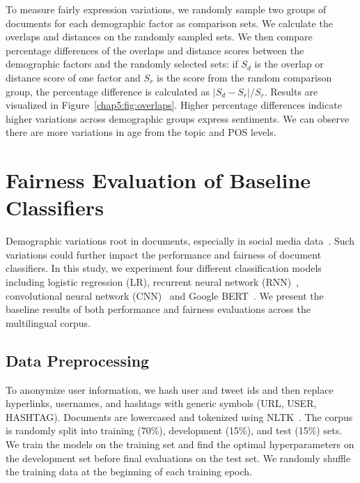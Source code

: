 To measure fairly expression variations, we randomly sample two groups of documents for each demographic factor as comparison sets. 
We calculate the overlaps and distances on the randomly sampled sets. 
We then compare percentage differences of the overlaps and distance scores between the demographic factors and the randomly selected sets: if $S_d$ is the overlap or distance score of one factor and $S_r$ is the score from the random comparison group, the percentage difference is calculated as $|S_d - S_r|/S_r$.
Results are visualized in Figure~\ref{chap5:fig:overlaps}. 
Higher percentage differences indicate higher variations across demographic groups express sentiments.
We can observe there are more variations in age from the topic and POS levels.


\section{Fairness Evaluation of Baseline Classifiers}
\label{chap5:sec:fair_eval}

Demographic variations root in documents, especially in social media data~\cite{volkova2013exploring,hovy2015demographic,johannsen2015cross}.
Such variations could further impact the performance and fairness of document classifiers.
In this study, we experiment four different classification models including logistic regression (LR), recurrent neural network (RNN)~\cite{chung2014empirical}, convolutional neural network (CNN)~\cite{kim2014convolutional} and Google BERT~\cite{devlin2019bert}.
We present the baseline results of both performance and fairness evaluations across the multilingual corpus.

\subsection{Data Preprocessing}
To anonymize user information, we hash user and tweet ids and then replace hyperlinks, usernames, and hashtags with generic symbols (URL, USER, HASHTAG).
Documents are lowercased and tokenized using NLTK~\cite{bird2004nltk}. 
The corpus is randomly split into training (70\%), development (15\%), and test (15\%) sets. 
We train the models on the training set and find the optimal hyperparameters on the development set before final evaluations on the test set. 
We randomly shuffle the training data at the beginning of each training epoch.



